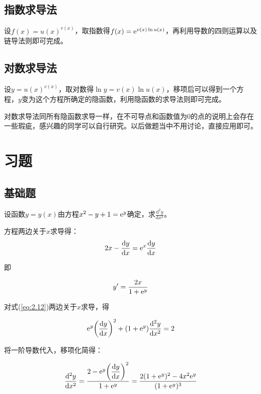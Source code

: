 \subsection{指数求导法}\label{sec:2.10.1}
设$f(x)=u(x)^{v(x)}$，取指数得$f(x)={\rm e}^{v(x)\ln{u(x)}}$，再利用导数的四则运算以及链导法则即可完成。

\subsection{对数求导法}\label{sec:2.10.2}

设$y=u(x)^{v(x)}$，取对数得$\ln{y}=v(x)\ln{u(x)}$，移项后可以得到一个方程，$y$变为这个方程所确定的隐函数，利用隐函数的求导法则即可完成。

\begin{remark}
	对数求导法同所有隐函数求导一样，在不可导点和函数值为0的点的说明上会存在一些瑕疵，感兴趣的同学可以自行研究。以后做题当中不用讨论，直接应用即可。
\end{remark}

\section{习题}\label{2.11}

\subsection{基础题}\label{2.11.1}

\begin{problem}
	设函数$y=y(x)$由方程$x^2-y+1={\rm e}^y$确定，求$\frac{\mathrm{d}^2y}{\mathrm{d}x^2}$。
	\begin{solution}
		方程两边关于$x$求导得：
		\begin{equation}
			2x-\frac{\mathrm{d}y}{\mathrm{d}x}={\rm e}^x\frac{\mathrm{d}y}{\mathrm{d}x}\label{eq:2.12}
		\end{equation}
	
		即
		
		\[y'=\frac{2x}{1+{\rm e}^y}\]
		
		对式(\ref{eq:2.12})两边关于$x$求导，得
		
		\[{\rm e}^y\qty(\frac{\mathrm{d}y}{\mathrm{d}x})^2+(1+{\rm e}^y)\frac{\mathrm{d}^2y}{\mathrm{d}x^2}=2\]
		
		将一阶导数代入，移项化简得：
		
		\[\frac{\mathrm{d}^2y}{\mathrm{d}x^2}=\frac{2-{\rm e}^y\qty(\dfrac{\mathrm{d}y}{\mathrm{d}x})^2}{1+{\rm e}^y}=\frac{2(1+{\rm e}^y)^2-4x^2{\rm e}^y}{(1+{\rm e}^y)^3}\]
	\end{solution}
\end{problem}

